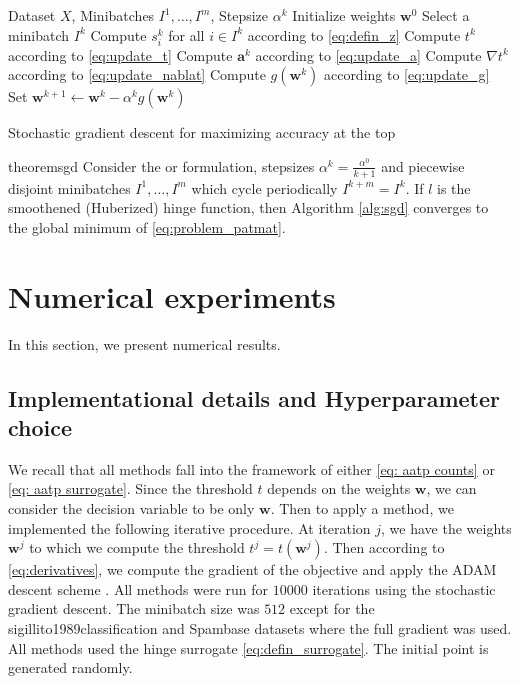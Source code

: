 \begin{algorithm}[!ht]
  \begin{algorithmic}[1]
    \Require Dataset $X$, Minibatches $I^1,\dots,I^m$, Stepsize $\alpha^k$
    \State Initialize weights $\bm{w}^0$
    \State Select a minibatch $I^k$
    \State Compute $s_i^k$ for all $i\in I^k$ according to \eqref{eq:defin_z}
    \State Compute $t^k$ according to \eqref{eq:update_t}
    \State Compute $\bm{a}^k$ according to \eqref{eq:update_a}
    \State Compute $\nabla t^k$ according to \eqref{eq:update_nablat}
    \State Compute $g(\bm{w}^k)$ according to \eqref{eq:update_g}
    \State Set $\bm{w}^{k+1}\gets \bm{w}^k - \alpha^k g(\bm{w}^k)$
    \EndFor
  \end{algorithmic}
  \caption{Stochastic gradient descent for maximizing accuracy at the top}
  \label{alg:sgd}
\end{algorithm}

\begin{restatable}{theorem}{sgd}\label{thm:sgd}
  Consider the \PatMat or \PatMatNP formulation, stepsizes $\alpha^k = \frac{\alpha^0}{k+1}$ and piecewise disjoint minibatches $I^1,\dots,I^m$ which cycle periodically $I^{k+m}=I^k$. If $l$ is the smoothened (Huberized) hinge function, then Algorithm \ref{alg:sgd} converges to the global minimum of \eqref{eq:problem_patmat}.  
\end{restatable}

\section{Numerical experiments}\label{sec:num1}

In this section, we present numerical results.

\subsection{Implementational details and Hyperparameter choice}

We recall that all methods fall into the framework of either \eqref{eq: aatp counts} or \eqref{eq: aatp surrogate}. Since the threshold $t$ depends on the weights $\bm{w}$, we can consider the decision variable to be only $\bm{w}$. Then to apply a method, we implemented the following iterative procedure. At iteration $j$, we have the weights $\bm{w}^j$ to which we compute the threshold $t^j=t(\bm{w}^j)$. Then according to \eqref{eq:derivatives}, we compute the gradient of the objective and apply the ADAM descent scheme \cite{kingma2014adam}. All methods were run for $10000$ iterations using the stochastic gradient descent. The minibatch size was $512$ except for the sigillito1989classification and Spambase datasets where the full gradient was used. All methods used the hinge surrogate \eqref{eq:defin_surrogate}. The initial point is generated randomly.

